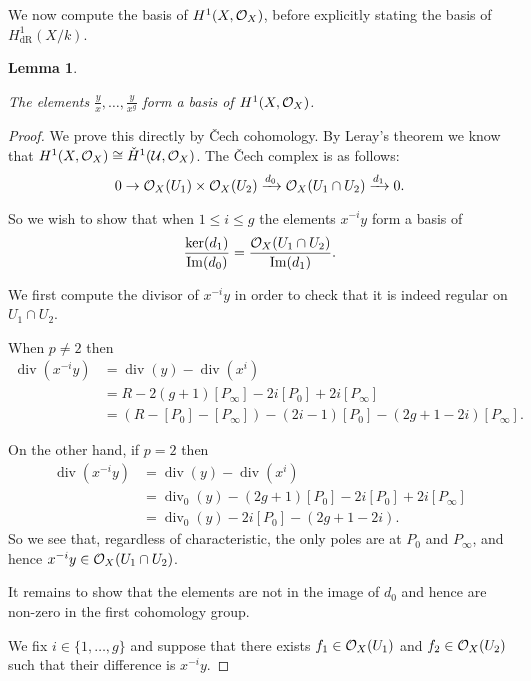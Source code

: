 \documentclass[draft, 11pt]{article} %
\theoremstyle{plain}
\newtheorem{lem}[defn]{Lemma}
\theoremstyle{remark}
\newcommand{\cO}{{\cal O}}
\newcommand{\cU}{{\mathcal U}}
\newcommand{\cech}{\v{C}ech }
\newcommand{\derhamhone}{H_{\text {dR}}^1(X/k)}
\DeclareMathOperator{\di}{div}
\DeclareMathOperator{\Ima}{Im}
\begin{document}
We now compute the basis of $H^1(X,\cO_X)$, before explicitly stating the basis of $\derhamhone$.\\
\begin{lem}\label{basish1}
 
 The elements $\frac{y}{x}, \ldots , \frac{y}{x^g}$ form a basis of $H^1(X,\cO_X)$.
 
\end{lem}
\begin{proof}
 
We prove this directly by \cech cohomology.
By Leray's theorem  we know that $H^1(X,\cO_X) \cong \check{H}^1(\cU,\cO_X)$.
The \cech complex is as follows:
\begin{equation*}
0 \rightarrow \cO_X(U_1) \times \cO_X(U_2) \xrightarrow{d_0} \cO_X(U_1 \cap U_2) \xrightarrow{d_1} 0.
\end{equation*}

So we wish to show that when $1 \leq i \leq g$ the elements $x^{-i}y$ form a basis of 
\begin{equation*}
\frac{\ker (d_1)}{\Ima (d_0)} = \frac{ \cO_X(U_1 \cap U_2)}{\Ima (d_1)}.
\end{equation*}


We first compute the divisor of $x^{-i}y$ in order to check that it is indeed regular on $U_1 \cap U_2$.

When $p \neq 2$ then
\begin{align*}
    \di(x^{-i}y) & = \di(y) - \di(x^i) \\
    & = R - 2(g+1)[P_\infty] - 2i[P_0] + 2i[P_\infty] \\
    & = (R - [P_0] - [P_\infty]) -(2i-1)[P_0] - (2g +1 -2i)[P_\infty].
\end{align*}

On the other hand, if $p =2$ then 
\begin{align*}
    \di(x^{-i}y) & = \di(y) - \di(x^i) \\
    & = \di_0(y) - (2g+1)[P_0] -2i[P_0] + 2i[P_\infty] \\
    & = \di_0(y) -2i[P_0] - ( 2g + 1 -2i).
\end{align*}
So we see that, regardless of characteristic, the only poles are at $P_0$ and $P_\infty$, and hence $x^{-i}y \in \cO_X(U_1 \cap U_2)$.

It remains to show that the elements are not in the image of $d_0$ and hence are non-zero in the first cohomology group.

We  fix $i \in \{1, \ldots, g\}$ and suppose that there exists $f_1 \in \cO_X(U_1)$ and $f_2 \in \cO_X(U_2)$ such that their difference is $x^{-i}y$.



\end{proof}
\end{document}
